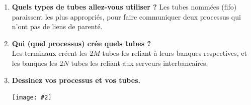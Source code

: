 \documentclass[french, a4paper, 12pt, titlepage]{article}
\newcommand{\graph}[2]{
\medskip
	\begin{center}
		\texttt{[image: \#2]}
	\end{center}
\medskip
}
\begin{document}
\begin{enumerate}
\item \textbf{Quels types de tubes allez-vous utiliser ?}
Les tubes nommées (fifo) paraissent les plus appropriés, pour faire communiquer deux processus qui n'ont pas de liens de parenté.\\

\item \textbf{Qui (quel processus) crée quels tubes ?}\\
Les terminaux créent les $2M$ tubes les reliant à leurs banques respectives, et les banques les $2N$ tubes les reliant aux serveurs interbancaires.\\

\pagebreak
\item \textbf{Dessinez vos processus et vos tubes.}\\
\graph{0.2}{pipe}

\end{enumerate}
\end{document}
